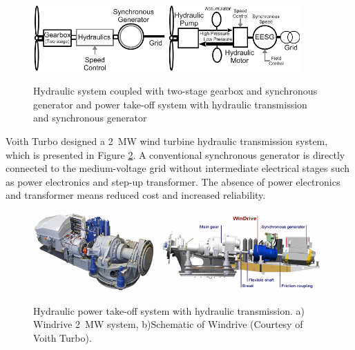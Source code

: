 \documentclass[a4paper, 11pt]{article} %
\begin{document}
  \begin{figure}[b]
    \centering
    \includegraphics[width=0.45\textwidth]{hydraulics}
    \hfill
    \includegraphics[width=0.45\textwidth]{EESG_hydraulics}
    \caption{Hydraulic system coupled with two-stage gearbox and synchronous generator and power take-off system with hydraulic transmission and synchronous generator } 
    \label{hydraulics}
  \end{figure}

Voith Turbo designed a 2~MW wind turbine hydraulic transmission system, which is presented in Figure \ref{voith}. A conventional synchronous generator is directly connected to the medium-voltage grid without intermediate electrical stages such as power electronics and step-up transformer. The absence of power electronics and transformer means reduced cost and increased reliability.

  \begin{figure}
    \centering
    \includegraphics[height=1.2in]{voith_windrive}
    \includegraphics[height=1.2in]{voith_schematic}
    \caption{Hydraulic power take-off system with hydraulic transmission. a) Windrive 2~MW system, b)Schematic of Windrive (Courtesy of Voith Turbo).} 
    \label{voith}
  \end{figure}
\end{document}
